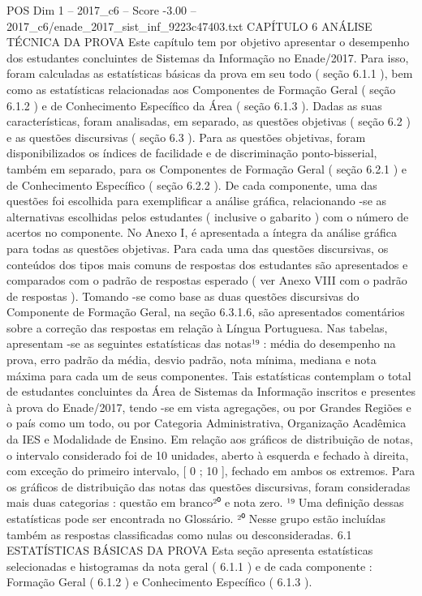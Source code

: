 \begin{textsample}{POS Dim 1 – 2017\_c6 – Score -3.00 – 2017\_c6/enade\_2017\_sist\_inf\_9223c47403.txt}  \label{ex:f1_pos_297}
CAPÍTULO 6 ANÁLISE TÉCNICA DA PROVA Este capítulo tem por objetivo apresentar o desempenho dos estudantes concluintes de Sistemas da Informação no Enade/2017.
Para isso, foram calculadas as estatísticas básicas da prova em seu todo ( seção 6.1.1 ), bem como as estatísticas relacionadas aos Componentes de Formação Geral ( seção 6.1.2 ) e de Conhecimento Específico da Área ( seção 6.1.3 ).
Dadas as suas características, foram analisadas, em separado, as questões objetivas ( seção 6.2 ) e as questões discursivas ( seção 6.3 ).
Para as questões objetivas, foram disponibilizados os índices de facilidade e de discriminação ponto-bisserial, também em separado, para os Componentes de Formação Geral ( seção 6.2.1 ) e de Conhecimento Específico ( seção 6.2.2 ).
De cada componente, uma das questões foi escolhida para exemplificar a análise gráfica, relacionando -se as alternativas escolhidas pelos estudantes ( inclusive o gabarito ) com o número de acertos no componente.
No Anexo I, é apresentada a íntegra da análise gráfica para todas as questões objetivas.
Para cada uma das questões discursivas, os conteúdos dos tipos mais comuns de respostas dos estudantes são apresentados e comparados com o padrão de respostas esperado ( ver Anexo VIII com o padrão de respostas ).
Tomando -se como base as duas questões discursivas do Componente de Formação Geral, na seção 6.3.1.6, são apresentados comentários sobre a correção das respostas em relação à Língua Portuguesa.
Nas tabelas, apresentam -se as seguintes estatísticas das notas¹⁹ : média do desempenho na prova, erro padrão da média, desvio padrão, nota mínima, mediana e nota máxima para cada um de seus componentes.
Tais estatísticas contemplam o total de estudantes concluintes da Área de Sistemas da Informação inscritos e presentes à prova do Enade/2017, tendo -se em vista agregações, ou por Grandes Regiões e o país como um todo, ou por Categoria Administrativa, Organização Acadêmica da IES e Modalidade de Ensino.
Em relação aos gráficos de distribuição de notas, o intervalo considerado foi de 10 unidades, aberto à esquerda e fechado à direita, com exceção do primeiro intervalo, [ 0 ; 10 ], fechado em ambos os extremos.
Para os gráficos de distribuição das notas das questões discursivas, foram consideradas mais duas categorias : questão em branco²⁰ e nota zero. ¹⁹ Uma definição dessas estatísticas pode ser encontrada no Glossário. ²⁰ Nesse grupo estão incluídas também as respostas classificadas como nulas ou desconsideradas. 6.1 ESTATÍSTICAS BÁSICAS DA PROVA Esta seção apresenta estatísticas selecionadas e histogramas da nota geral ( 6.1.1 ) e de cada componente : Formação Geral ( 6.1.2 ) e Conhecimento Específico ( 6.1.3 ).

\end{textsample}
